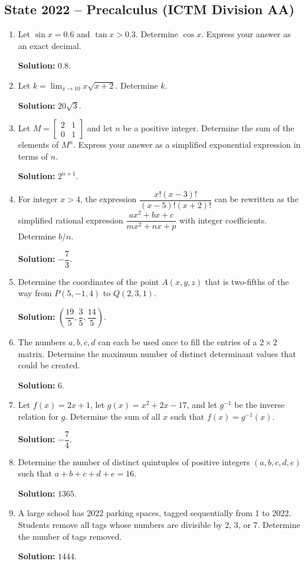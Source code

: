 \documentclass[10pt]{article}
\begin{document}
\subsection*{State 2022 -- Precalculus (ICTM Division AA)}
\begin{enumerate}
\item Let $\sin x=0.6$ and $\tan x>0.3$. Determine $\cos x$. Express your answer as an exact decimal.\par\textbf{Solution:} $0.8$.
\item Let $k=\displaystyle\lim_{x\to 10}x\sqrt{x+2}$. Determine $k$.\par\textbf{Solution:} $20\sqrt{3}$.
\item Let $M=\begin{bmatrix}2&1\\0&1\end{bmatrix}$ and let $n$ be a positive integer. Determine the sum of the elements of $M^n$. Express your answer as a simplified exponential expression in terms of $n$.\par\textbf{Solution:} $2^{n+1}$.
\item For integer $x>4$, the expression $\dfrac{x!(x-3)!}{(x-5)!(x+2)!}$ can be rewritten as the simplified rational expression $\dfrac{ax^2+bx+c}{mx^2+nx+p}$ with integer coefficients. Determine $b/n$.\par\textbf{Solution:} $-\dfrac{7}{3}$.
\item Determine the coordinates of the point $A(x,y,z)$ that is two-fifths of the way from $P(5,-1,4)$ to $Q(2,3,1)$.\par\textbf{Solution:} $\left(\dfrac{19}{5},\dfrac{3}{5},\dfrac{14}{5}\right)$.
\item The numbers $a,b,c,d$ can each be used once to fill the entries of a $2\times2$ matrix. Determine the maximum number of distinct determinant values that could be created.\par\textbf{Solution:} $6$.
\item Let $f(x)=2x+1$, let $g(x)=x^2+2x-17$, and let $g^{-1}$ be the inverse relation for $g$. Determine the sum of all $x$ such that $f(x)=g^{-1}(x)$.\par\textbf{Solution:} $-\dfrac{7}{4}$.
\item Determine the number of distinct quintuples of positive integers $(a,b,c,d,e)$ such that $a+b+c+d+e=16$.\par\textbf{Solution:} $1365$.
\item A large school has 2022 parking spaces, tagged sequentially from 1 to 2022. Students remove all tags whose numbers are divisible by 2, 3, or 7. Determine the number of tags removed.\par\textbf{Solution:} $1444$.

\end{enumerate}
\end{document}
